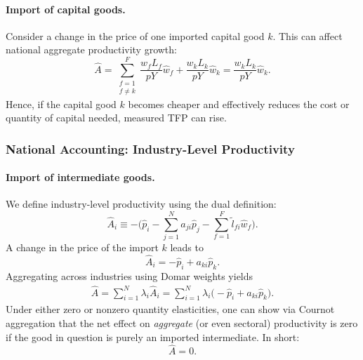 \documentclass[11pt]{article}
\begin{document}

\paragraph{Import of capital goods.} 
Consider a change in the price of one imported capital good $k$. This can affect national 
aggregate productivity growth:
\begin{equation}
\label{eq:agg_A_capital}
    \hat{A} 
     =  \sum_{\substack{f=1 \\ f \neq k}}^F \frac{w_f L_{f}}{p Y}  \hat{w}_f
     +  \frac{w_k L_{k}}{p Y} \hat{w}_k
     = 
    \frac{w_k L_{k}}{p Y} \hat{w}_k.
\end{equation}
Hence, if the capital good $k$ becomes cheaper and effectively reduces the cost or quantity of 
capital needed, measured TFP can rise.

\subsubsection{National Accounting: Industry-Level Productivity}

\paragraph{Import of intermediate goods.}
We define industry-level productivity using the dual definition:
\begin{equation}
\label{eq:A_i_dual_definition}
    \hat{A}_i 
     \equiv  
    - \Biggl( 
    \hat{p}_i 
     -  
    \sum_{j=1}^N  a_{ji} \hat{p}_j 
     -  
    \sum_{f=1}^F \tilde{l}_{fi} \hat{w}_f 
    \Biggr).
\end{equation}
A change in the price of the import $k$ leads to 
\begin{equation}
\label{eq_Ai_nullelasticity}
    \hat{A}_i 
     =  
    -  \hat{p}_i  +  a_{k i} \hat{p}_{k}.
\end{equation}
Aggregating across industries using Domar weights yields 
\begin{align*}
    \hat{A}
     = \sum_{i=1}^N \lambda_i  \hat{A}_i
     = \sum_{i=1}^N \lambda_i \bigl(- \hat{p}_i + a_{k i} \hat{p}_{k}\bigr).
\end{align*}
Under either zero or nonzero quantity elasticities, one can show via Cournot aggregation 
that the net effect on \emph{aggregate} (or even sectoral) productivity is zero if the good 
in question is purely an imported intermediate. In short:
\[
\hat{A}  =  0.
\]
\end{document}
